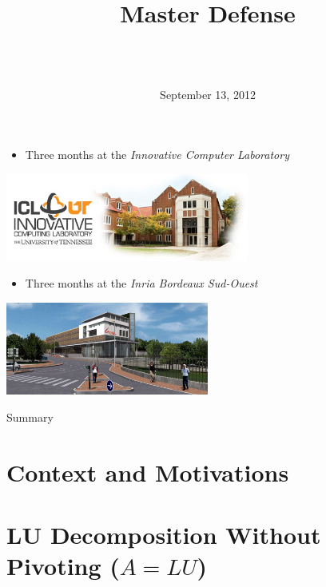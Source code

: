\documentclass{beamer}
\title[Enabling Partial Pivoting in Task Flow LU Factorization]{
        {\bfseries \projet\\} 
        {\bfseries \huge \sujet}
        {\small Master Defense}
}
\date{September 13, 2012}
\author[Zenati]{
  {\normalsize \bfseries \sffamily} {\large \gA}\\
  \vspace{1cm}
  {\normalsize \bfseries \sffamily} {\large \gB}\\
}
\begin{document}
\begin{frame}
\maketitle
\end{frame}

\begin{frame}
\begin{itemize}
\item Three months at the \textit{Innovative Computer Laboratory}
\end{itemize}
\begin{center}
\includegraphics[width=0.6\textwidth]{icl-claxton.jpg}
\end{center}
\begin{itemize}
\item Three months at the \textit{Inria Bordeaux Sud-Ouest}
\end{itemize}
\begin{center}
\includegraphics[width=0.5\textwidth]{bandeau-home-bordeaux.jpg}
\end{center}
\end{frame}

\begin{frame}{Summary}
\tableofcontents
\end{frame}

\section[Context]{Context and Motivations}


\section[Without Pivoting]{LU Decomposition Without Pivoting ($A=LU$)}

\end{document}
